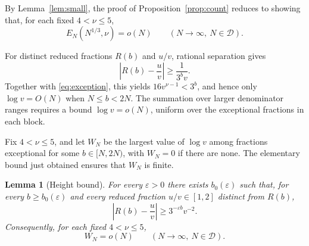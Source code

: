 \documentclass[11pt,reqno]{amsart}
\newtheorem{lemma}{Lemma}[section]
\theoremstyle{definition}
\newcommand{\DD}{\mathcal D}
\begin{document}
By Lemma~\ref{lem:small}, the proof of Proposition~\ref{prop:count}
reduces to showing that, for each fixed $4<\nu\le5$,
\[
 E_N(N^{1/3},\nu)=o(N)
 \qquad(N\to\infty,\ N\in\DD).
\]

For distinct reduced fractions $R(b)$ and $u/v$, rational
separation gives
\[
 \left|R(b)-\frac uv\right|\ge\frac1{3^bv}.
\]
Together with \eqref{eq:exception}, this yields
$16v^{\nu-1}<3^b$, and hence only $\log v=O(N)$ when
$N\le b<2N$. The summation over larger denominator ranges
requires a bound $\log v=o(N)$, uniform over the exceptional
fractions in each block.

Fix $4<\nu\le5$, and let $W_N$ be the largest value of
$\log v$ among fractions exceptional for some
$b\in[N,2N)$, with $W_N=0$ if there are none. The
elementary bound just obtained ensures that $W_N$ is finite.

\begin{lemma}[Height bound]\label{lem:height}
For every $\varepsilon>0$ there exists $b_0(\varepsilon)$
such that, for every $b\ge b_0(\varepsilon)$ and every
reduced fraction $u/v\in[1,2]$ distinct from $R(b)$,
\[
 \left|R(b)-\frac uv\right|
 \ge3^{-\varepsilon b}v^{-2}.
\]
Consequently, for each fixed $4<\nu\le5$,
\begin{equation}\label{eq:height}
 W_N=o(N)\qquad(N\to\infty,\ N\in\DD).
\end{equation}
\end{lemma}
\end{document}
